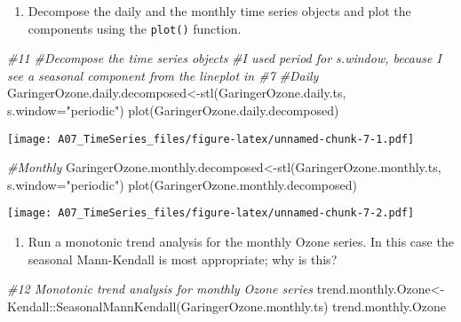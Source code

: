\documentclass[
]{article}
\newenvironment{Shaded}{\begin{snugshade}}{\end{snugshade}}
\newcommand{\AttributeTok}[1]{\textcolor[rgb]{0.77,0.63,0.00}{#1}}
\newcommand{\CommentTok}[1]{\textcolor[rgb]{0.56,0.35,0.01}{\textit{#1}}}
\newcommand{\FunctionTok}[1]{\textcolor[rgb]{0.00,0.00,0.00}{#1}}
\newcommand{\NormalTok}[1]{#1}
\newcommand{\OtherTok}[1]{\textcolor[rgb]{0.56,0.35,0.01}{#1}}
\newcommand{\SpecialCharTok}[1]{\textcolor[rgb]{0.00,0.00,0.00}{#1}}
\newcommand{\StringTok}[1]{\textcolor[rgb]{0.31,0.60,0.02}{#1}}
\providecommand{\tightlist}{%
  \setlength{\itemsep}{0pt}\setlength{\parskip}{0pt}}
\begin{document}
\begin{enumerate}
\def\labelenumi{\arabic{enumi}.}
\setcounter{enumi}{10}
\tightlist
\item
  Decompose the daily and the monthly time series objects and plot the
  components using the \texttt{plot()} function.
\end{enumerate}

\begin{Shaded}
\begin{Highlighting}[]
\CommentTok{\#11}
\CommentTok{\#Decompose the time series objects }
\CommentTok{\#I used period for s.window, because I see a seasonal component from the lineplot in \#7}
\CommentTok{\#Daily}
\NormalTok{GaringerOzone.daily.decomposed}\OtherTok{\textless{}{-}}\FunctionTok{stl}\NormalTok{(GaringerOzone.daily.ts, }\AttributeTok{s.window=}\StringTok{"periodic"}\NormalTok{)}
\FunctionTok{plot}\NormalTok{(GaringerOzone.daily.decomposed)}
\end{Highlighting}
\end{Shaded}

\texttt{[image: A07\_TimeSeries\_files/figure-latex/unnamed-chunk-7-1.pdf]}

\begin{Shaded}
\begin{Highlighting}[]
\CommentTok{\#Monthly }
\NormalTok{GaringerOzone.monthly.decomposed}\OtherTok{\textless{}{-}}\FunctionTok{stl}\NormalTok{(GaringerOzone.monthly.ts, }\AttributeTok{s.window=}\StringTok{"periodic"}\NormalTok{)}
\FunctionTok{plot}\NormalTok{(GaringerOzone.monthly.decomposed)}
\end{Highlighting}
\end{Shaded}

\texttt{[image: A07\_TimeSeries\_files/figure-latex/unnamed-chunk-7-2.pdf]}

\begin{enumerate}
\def\labelenumi{\arabic{enumi}.}
\setcounter{enumi}{11}
\tightlist
\item
  Run a monotonic trend analysis for the monthly Ozone series. In this
  case the seasonal Mann-Kendall is most appropriate; why is this?
\end{enumerate}

\begin{Shaded}
\begin{Highlighting}[]
\CommentTok{\#12 Monotonic trend analysis for monthly Ozone series}
\NormalTok{trend.monthly.Ozone}\OtherTok{\textless{}{-}}\NormalTok{ Kendall}\SpecialCharTok{::}\FunctionTok{SeasonalMannKendall}\NormalTok{(GaringerOzone.monthly.ts)}
\NormalTok{trend.monthly.Ozone}
\end{Highlighting}
\end{Shaded}
\end{document}
